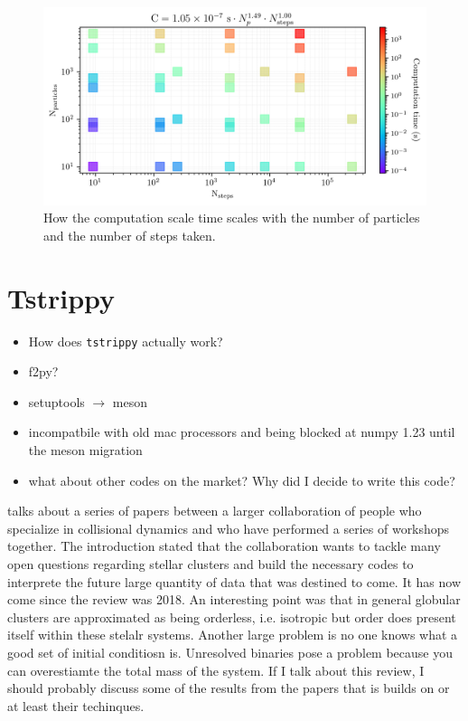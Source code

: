         \begin{figure}
            \centering
            \includegraphics[width=\linewidth]{images/NumericalErrorComputationTimeScalingForStreams.png}
            \caption{How the computation scale time scales with the number of particles and the number of steps taken.}
            \label{fig:NumericalErrorComputationTimeScalingForStreams}
        \end{figure}


        




\section{Tstrippy}

    \begin{itemize}
        \item How does \texttt{tstrippy} actually work?
        \item f2py? 
        \item setuptools $\rightarrow$ meson 
        \item incompatbile with old mac processors and being blocked at numpy 1.23 until the meson migration 
        \item what about other codes on the market? Why did I decide to write this code? 
    \end{itemize}

    \citet{2018ComAC...5....2V} talks about a series of papers between a larger collaboration of people who specialize in collisional dynamics and who have performed a series of workshops together. The introduction stated that the collaboration wants to tackle many open questions regarding stellar clusters and build the necessary codes to interprete the future large quantity of data that was destined to come. It has now come since the review was 2018. An interesting point was that in general globular clusters are approximated as being orderless, i.e. isotropic but order does present itself within these stelalr systems. Another large problem is no one knows what a good set of initial conditiosn is. Unresolved binaries pose a problem because you can overestiamte the total mass of the system. If I talk about this review, I should probably discuss some of the results from the papers that is builds on or at least their techinques.

